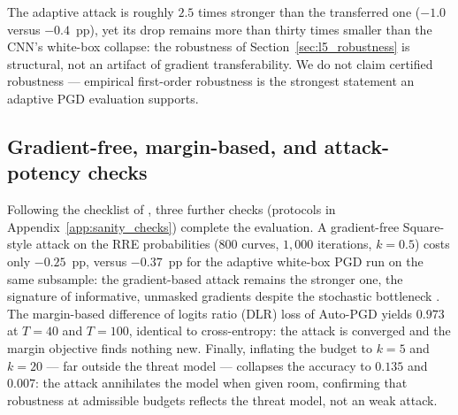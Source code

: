 \documentclass{aa}
\begin{document}
The adaptive attack is roughly $2.5$ times stronger than the transferred
one ($-1.0$ versus $-0.4$~pp), yet its drop remains more than thirty
times smaller than the CNN's white-box collapse: the robustness of
Section~\ref{sec:l5_robustness} is structural, not an artifact of
gradient transferability. We do not claim certified robustness ---
empirical first-order robustness is the strongest statement an adaptive
PGD evaluation supports.

\subsection{Gradient-free, margin-based, and attack-potency checks}
\label{sec:sanity_checks}
Following the checklist of \citet{carlini2019evaluating}, three further checks (protocols in Appendix~\ref{app:sanity_checks}) complete the evaluation. A gradient-free Square-style attack on the RRE probabilities ($800$ curves, $1{,}000$ iterations, $k=0.5$) costs only $-0.25$~pp, versus $-0.37$~pp for the adaptive white-box PGD run on the same subsample: the gradient-based attack remains the stronger one, the signature of informative, unmasked gradients despite the stochastic bottleneck \citep{korshunova2021closer,athalye2018obfuscated}. The margin-based difference of logits ratio (DLR) loss of Auto-PGD \citep{croce2020reliable} yields $0.973$ at $T=40$ and $T=100$, identical to cross-entropy: the attack is converged and the margin objective finds nothing new. Finally, inflating the budget to $k=5$ and $k=20$ --- far outside the threat model --- collapses the accuracy to $0.135$ and $0.007$: the attack annihilates the model when given room, confirming that robustness at admissible budgets reflects the threat model, not an weak attack.

\end{document}
